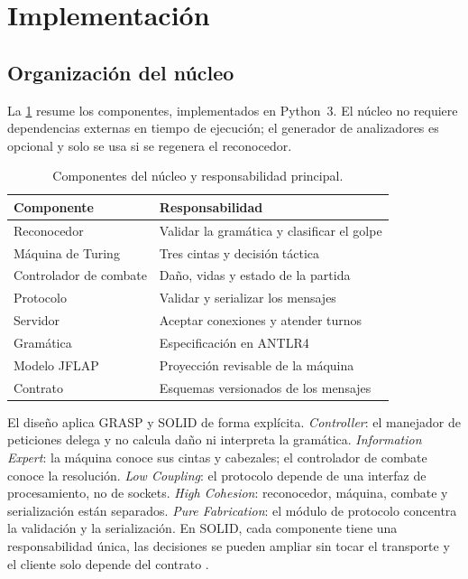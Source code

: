 \documentclass[9pt]{ieeeconf}
\begin{document}
\section{Implementación}
\label{sec:implementacion}

\subsection{Organización del núcleo}
\label{sec:nucleo}

La \cref{tab:modulos} resume los componentes, implementados en Python~3. El núcleo no requiere dependencias externas en tiempo de ejecución; el generador de analizadores es opcional y solo se usa si se regenera el reconocedor.

\begin{table}[t]
\centering
\caption{Componentes del núcleo y responsabilidad principal.}
\label{tab:modulos}
\setlength{\tabcolsep}{4pt}
\begin{tabular}{l l}
\toprule
\textbf{Componente} & \textbf{Responsabilidad} \\
\midrule
Reconocedor & Validar la gramática y clasificar el golpe \\
Máquina de Turing & Tres cintas y decisión táctica \\
Controlador de combate & Daño, vidas y estado de la partida \\
Protocolo & Validar y serializar los mensajes \\
Servidor & Aceptar conexiones y atender turnos \\
Gramática & Especificación en ANTLR4 \\
Modelo JFLAP & Proyección revisable de la máquina \\
Contrato & Esquemas versionados de los mensajes \\
\bottomrule
\end{tabular}
\end{table}

El diseño aplica GRASP y SOLID de forma explícita. \emph{Controller}: el manejador de peticiones delega y no calcula daño ni interpreta la gramática. \emph{Information Expert}: la máquina conoce sus cintas y cabezales; el controlador de combate conoce la resolución. \emph{Low Coupling}: el protocolo depende de una interfaz de procesamiento, no de sockets. \emph{High Cohesion}: reconocedor, máquina, combate y serialización están separados. \emph{Pure Fabrication}: el módulo de protocolo concentra la validación y la serialización. En SOLID, cada componente tiene una responsabilidad única, las decisiones se pueden ampliar sin tocar el transporte y el cliente solo depende del contrato \cite{nystrom2014,gregory2018}.
\end{document}
